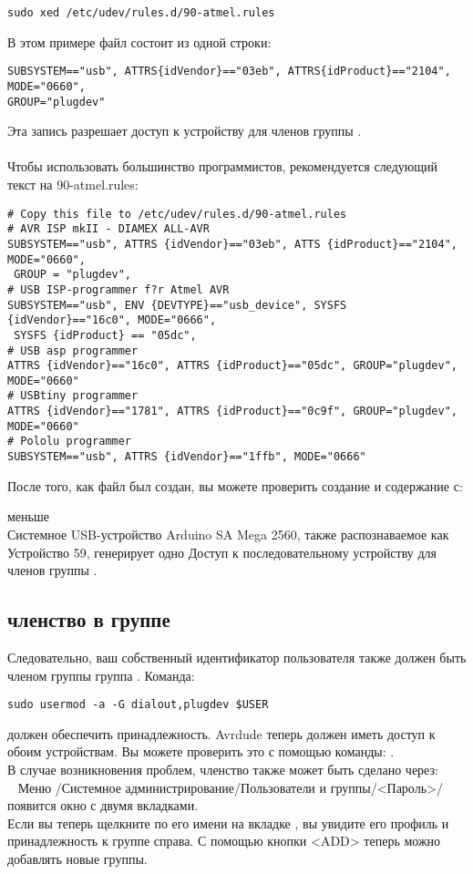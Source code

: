 \begin{large} \vspace{-0.4em} \begin{verbatim}
sudo xed /etc/udev/rules.d/90-atmel.rules
\end{verbatim} \end{large}
В этом примере файл  состоит из одной строки:
\begin{verbatim}
SUBSYSTEM=="usb", ATTRS{idVendor}=="03eb", ATTRS{idProduct}=="2104", MODE="0660",
GROUP="plugdev"
\end{verbatim}
Эта запись разрешает доступ к устройству для членов группы . \\
~ \\
Чтобы использовать большинство программистов, рекомендуется следующий текст на 90-atmel.rules:
\begin{verbatim}
# Copy this file to /etc/udev/rules.d/90-atmel.rules
# AVR ISP mkII - DIAMEX ALL-AVR
SUBSYSTEM=="usb", ATTRS {idVendor}=="03eb", ATTS {idProduct}=="2104", MODE="0660", 
 GROUP = "plugdev",
# USB ISP-programmer f?r Atmel AVR
SUBSYSTEM=="usb", ENV {DEVTYPE}=="usb_device", SYSFS {idVendor}=="16c0", MODE="0666",
 SYSFS {idProduct} == "05dc",
# USB asp programmer
ATTRS {idVendor}=="16c0", ATTRS {idProduct}=="05dc", GROUP="plugdev", MODE="0660"
# USBtiny programmer
ATTRS {idVendor}=="1781", ATTRS {idProduct}=="0c9f", GROUP="plugdev", MODE="0660"
# Pololu programmer
SUBSYSTEM=="usb", ATTRS {idVendor}=="1ffb", MODE="0666"
\end{verbatim}
После того, как файл был создан, вы можете проверить создание и содержание с:

меньше  \\
Системное USB-устройство Arduino SA Mega 2560, также распознаваемое как Устройство 59, генерирует одно
Доступ к последовательному устройству  для членов группы .
\subsection{членство в группе}
Следовательно, ваш собственный идентификатор пользователя также должен быть членом группы 
группа . Команда:

\begin{large} \vspace{-0.4em} \begin{verbatim}
sudo usermod -a -G dialout,plugdev $USER
\end{verbatim} \end{large}
должен обеспечить принадлежность.
Avrdude теперь должен иметь доступ к обоим устройствам.
Вы можете проверить это с помощью команды: . \\
В случае возникновения проблем, членство также может быть сделано через: \\
~ Меню /Системное администрирование/Пользователи и группы/<Пароль>/появится окно с двумя вкладками. \\
Если вы теперь щелкните по его имени на вкладке , вы увидите его профиль и принадлежность к группе справа.
С помощью кнопки <ADD> теперь можно добавлять новые группы.

